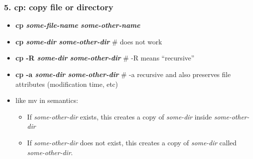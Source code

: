 \documentclass[English]{beamer}
\begin{document}
\begin{frame}
  \frametitle {5. cp: copy file or directory}
  \begin{itemize}
    
  \item \textbf{cp \emph{some-file-name} \emph{some-other-name}}
    
    
  \item \textbf{cp \emph{some-dir} \emph{some-other-dir}} \# does not work 

  \item \textbf{cp -R \emph{some-dir} \emph{some-other-dir}} \# -R
    means ``recursive''
  \item \textbf{cp -a \emph{some-dir} \emph{some-other-dir}} \# -a
   recursive and also preserves file attributes (modification time, etc)
   \item like mv in semantics:
  \begin{itemize}
    \item If \emph{some-other-dir} exists, this 
       creates a copy of \emph{some-dir} inside \emph{some-other-dir}
    \item If \emph{some-other-dir} does not exist, this creates a copy
       of \emph{some-dir} called  \emph{some-other-dir}.
    \end{itemize}
  \end{itemize}
\end{frame}
\end{document}

